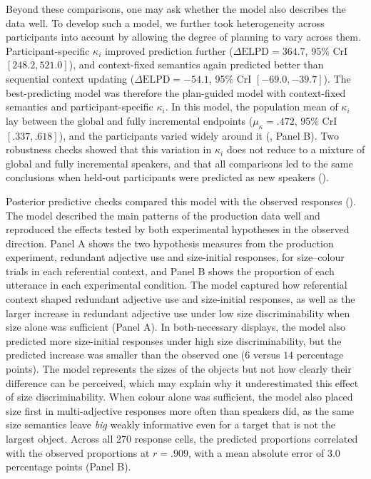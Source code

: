 \documentclass[10pt,a4paper,fleqn]{article}
\begin{document}
Beyond these comparisons, one may ask whether the model also describes the data well.
To develop such a model, we further took heterogeneity across participants into account by allowing the degree of planning to vary across them.
Participant-specific $\kappa_i$ improved prediction further ($\Delta\mathrm{ELPD}=364.7$, 95\% CrI $[248.2,521.0]$), and context-fixed semantics again predicted better than sequential context updating ($\Delta\mathrm{ELPD}=-54.1$, 95\% CrI $[-69.0,-39.7]$).
The best-predicting model was therefore the plan-guided model with context-fixed semantics and participant-specific $\kappa_i$.
In this model, the population mean of $\kappa_i$ lay between the global and fully incremental endpoints ($\mu_{\kappa}=.472$, 95\% CrI $[.337,.618]$), and the participants varied widely around it (, Panel B).
Two robustness checks showed that this variation in $\kappa_i$ does not reduce to a mixture of global and fully incremental speakers, and that all comparisons led to the same conclusions when held-out participants were predicted as new speakers ().

Posterior predictive checks compared this model with the observed responses ().
The model described the main patterns of the production data well and reproduced the effects tested by both experimental hypotheses in the observed direction.
Panel A shows the two hypothesis measures from the production experiment, redundant adjective use and size-initial responses, for size--colour trials in each referential context, and Panel B shows the proportion of each utterance in each experimental condition.
The model captured how referential context shaped redundant adjective use and size-initial responses, as well as the larger increase in redundant adjective use under low size discriminability when size alone was sufficient (Panel A).
In both-necessary displays, the model also predicted more size-initial responses under high size discriminability, but the predicted increase was smaller than the observed one ($6$ versus $14$ percentage points).
The model represents the sizes of the objects but not how clearly their difference can be perceived, which may explain why it underestimated this effect of size discriminability.
When colour alone was sufficient, the model also placed size first in multi-adjective responses more often than speakers did, as the same size semantics leave \emph{big} weakly informative even for a target that is not the largest object.
Across all 270 response cells, the predicted proportions correlated with the observed proportions at $r=.909$, with a mean absolute error of $3.0$ percentage points (Panel B).
\end{document}
